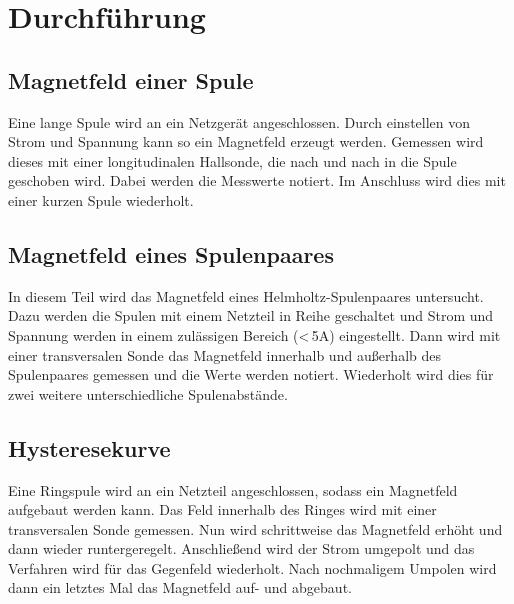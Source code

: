 \section{Durchführung}

\subsection{Magnetfeld einer Spule}
Eine lange Spule wird an ein Netzgerät angeschlossen. Durch einstellen von Strom und Spannung kann so ein Magnetfeld erzeugt werden. Gemessen wird dieses mit einer longitudinalen Hallsonde, die nach und nach in die
Spule geschoben wird. Dabei werden die Messwerte notiert. Im Anschluss wird dies mit einer kurzen Spule wiederholt.

\subsection{Magnetfeld eines Spulenpaares}
In diesem Teil wird das Magnetfeld eines Helmholtz-Spulenpaares untersucht. Dazu werden die Spulen mit einem Netzteil in Reihe geschaltet und Strom und Spannung werden in einem zulässigen Bereich (<\,5A) eingestellt.
Dann wird mit einer transversalen Sonde das Magnetfeld innerhalb und außerhalb des Spulenpaares gemessen und die Werte werden notiert. Wiederholt wird dies für zwei weitere unterschiedliche Spulenabstände.

\subsection{Hysteresekurve}
Eine Ringspule wird an ein Netzteil angeschlossen, sodass ein Magnetfeld aufgebaut werden kann. Das Feld innerhalb des Ringes wird mit einer transversalen Sonde gemessen. Nun wird schrittweise das Magnetfeld erhöht und 
dann wieder runtergeregelt. Anschließend wird der Strom umgepolt und das Verfahren wird für das Gegenfeld wiederholt. Nach nochmaligem Umpolen wird dann ein letztes Mal das Magnetfeld auf- und abgebaut.